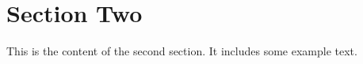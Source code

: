 \section{Section Two}
This is the content of the second section. It includes some example text.

\lipsum[1] %
